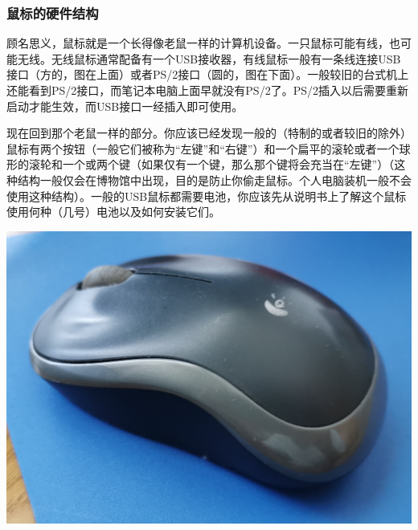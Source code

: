 \subsubsection{鼠标的硬件结构}
顾名思义，鼠标就是一个长得像老鼠一样的计算机设备。一只鼠标可能有线，也可能无线。无线鼠标通常配备有一个USB接收器，有线鼠标一般有一条线连接USB接口（方的，图在上面）或者PS/2接口（圆的，图在下面）。一般较旧的台式机上还能看到PS/2接口，而笔记本电脑上面早就没有PS/2了。PS/2插入以后需要重新启动才能生效，而USB接口一经插入即可使用。\par
现在回到那个老鼠一样的部分。你应该已经发现一般的（特制的或者较旧的除外）鼠标有两个按钮（一般它们被称为“左键”和“右键”）和一个扁平的滚轮或者一个球形的滚轮和一个或两个键（如果仅有一个键，那么那个键将会充当在“左键”）（这种结构一般仅会在博物馆中出现，目的是防止你偷走鼠标。个人电脑装机一般不会使用这种结构）。一般的USB鼠标都需要电池，你应该先从说明书上了解这个鼠标使用何种（几号）电池以及如何安装它们。
\begin{center}
	\includegraphics[scale=0.1]{pic/Mouse}
\end{center}\par
